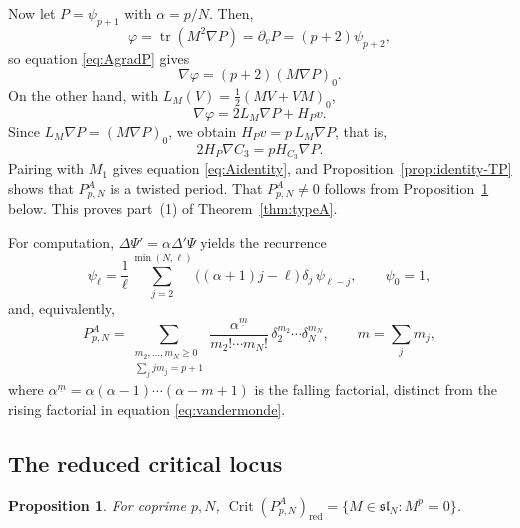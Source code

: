 \documentclass[10pt,reqno]{amsart}
\numberwithin{equation}{section}
\theoremstyle{plain}
\newtheorem{proposition}[theorem]{Proposition}
\theoremstyle{definition}
\DeclareMathOperator{\tr}{tr}
\DeclareMathOperator{\Crit}{Crit}
\newcommand{\red}{\mathrm{red}}
\begin{document}
Now let $P=\psi_{p+1}$ with $\alpha=p/N$. Then, 
\begin{equation*}
    \varphi=\tr(M^2\nabla P)=\partial_vP=(p+2)\psi_{p+2} ,
\end{equation*}
so equation \eqref{eq:AgradP} gives 
\begin{equation*}
    \nabla\varphi=(p+2)(M\nabla P)_0 .
\end{equation*}
On the other hand, with $L_M(V)=\tfrac12(MV+VM)_0$,
\begin{equation*}
	\nabla\varphi=2L_M\nabla P+H_Pv .
\end{equation*}
Since $L_M\nabla P=(M\nabla P)_0$, we obtain $H_Pv=p\,L_M\nabla P$, that is, 
\begin{equation*}
    2H_P\nabla C_3=pH_{C_3}\nabla P.
\end{equation*}
Pairing with $M_1$ gives equation \eqref{eq:Aidentity}, and Proposition~\ref{prop:identity-TP} shows that $P^A_{p,N}$ is a twisted period. That $P^A_{p,N}\neq0$ follows from Proposition~\ref{prop:A-crit} below. This proves part~(1) of Theorem~\ref{thm:typeA}.

For computation, $\Delta\Psi'=\alpha\Delta'\Psi$ yields the recurrence
\begin{equation}\label{eq:Arecurrence}
	\psi_\ell=\frac1\ell\sum_{j=2}^{\min(N,\ell)}\big((\alpha+1)j-\ell\big)\,\delta_j\,\psi_{\ell-j},\qquad \psi_0=1,
\end{equation}
and, equivalently,
\begin{equation*}
	P^A_{p,N}=\sum_{\substack{m_2,\dots,m_N\ge0\\ \sum_jjm_j=p+1}}\frac{\alpha^{\underline m}}{m_2!\cdots m_N!}\,\delta_2^{m_2}\cdots\delta_N^{m_N},\qquad m=\sum_jm_j,
\end{equation*}
where $\alpha^{\underline m}=\alpha(\alpha-1)\cdots(\alpha-m+1)$ is the falling factorial, distinct from the rising factorial in equation \eqref{eq:vandermonde}.

\subsection{The reduced critical locus}

\begin{proposition}\label{prop:A-crit}
For coprime $p,N$, $\Crit(P^A_{p,N})_\red=\{M\in\mathfrak{sl}_N:M^p=0\}$.
\end{proposition}
\end{document}
